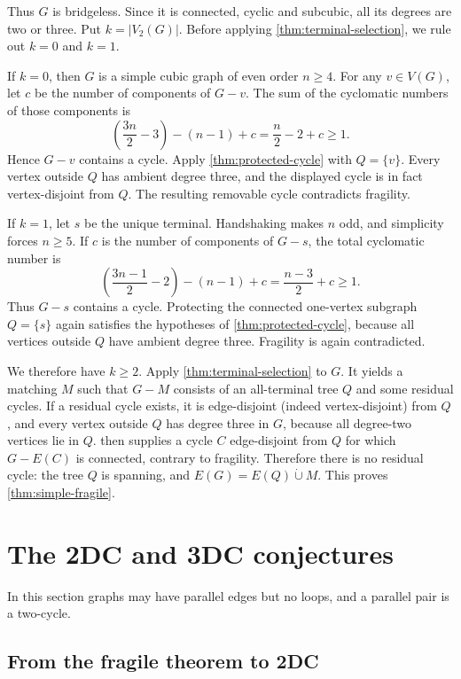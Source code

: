 \documentclass[a4paper,11pt]{article}
\newcommand{\abs}[1]{\left\lvert#1\right\rvert}
\newcommand{\Vtwo}{V_2}                      %
\newcommand{\dcup}{\mathbin{\dot\cup}}         %
\numberwithin{equation}{section}
\begin{document}
Thus $G$ is bridgeless. Since it is connected, cyclic and subcubic, all its
degrees are two or three. Put $k=\abs{\Vtwo(G)}$. Before applying
\cref{thm:terminal-selection}, we rule out $k=0$ and $k=1$.

If $k=0$, then $G$ is a simple cubic graph of even order $n\ge 4$. For any
$v\in V(G)$, let $c$ be the number of components of $G-v$. The sum of the
cyclomatic numbers of those components is
\[
  \left(\frac{3n}{2}-3\right)-(n-1)+c=\frac n2-2+c\ge 1 .
\]
Hence $G-v$ contains a cycle. Apply \cref{thm:protected-cycle} with $Q=\{v\}$.
Every vertex outside $Q$ has
ambient degree three, and the displayed cycle is in fact vertex-disjoint from
$Q$. The resulting removable cycle contradicts fragility.

If $k=1$, let $s$ be the unique terminal. Handshaking makes $n$ odd, and
simplicity forces $n\ge 5$. If $c$ is the number of components of $G-s$, the
total cyclomatic number is
\[
  \left(\frac{3n-1}{2}-2\right)-(n-1)+c=\frac{n-3}{2}+c\ge 1 .
\]
Thus $G-s$ contains a cycle. Protecting the connected one-vertex subgraph
$Q=\{s\}$ again satisfies the hypotheses of \cref{thm:protected-cycle}, because all vertices
outside $Q$ have ambient degree three. Fragility is again contradicted.

We therefore have $k\ge 2$. Apply \cref{thm:terminal-selection} to $G$. It
yields a matching $M$ such that $G-M$ consists of an all-terminal tree $Q$ and
some residual cycles. If a residual cycle exists, it is edge-disjoint (indeed
vertex-disjoint) from $Q$, and every vertex outside $Q$ has degree three in $G$,
because all degree-two vertices lie in $Q$. 
then supplies a cycle $C$ edge-disjoint from $Q$ for which $G-E(C)$ is
connected, contrary to fragility. Therefore there is no residual cycle: the tree
$Q$ is spanning, and $E(G)=E(Q)\dcup M$. This proves \cref{thm:simple-fragile}.

\section{The 2DC and 3DC conjectures}\label{sec:conjectures}

In this section graphs may have parallel edges but no loops, and a parallel pair
is a two-cycle.

\subsection{From the fragile theorem to 2DC}\label{sec:2dc-interface}
\end{document}
